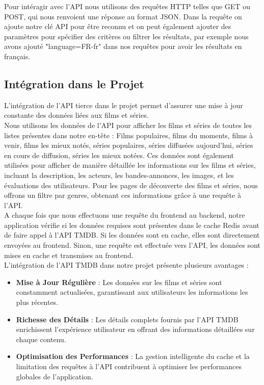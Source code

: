 \documentclass[a4paper]{article}
\begin{document}
Pour intéragir avec l'API nous utilisons des requêtes HTTP telles que GET ou POST, qui nous renvoient une réponse au format JSON. Dans la requête on ajoute notre clé API pour être reconnu et on peut également ajouter des paramètres pour spécifier des critères ou filtrer les résultats, par exemple nous avons ajouté "language=FR-fr" dans nos requêtes pour avoir les résultats en français. 

\subsection{Intégration dans le Projet}

L'intégration de l'API tierce dans le projet permet d'assurer une mise à jour constante des données liées aux films et séries. \\
Nous utilisons les données de l'API pour afficher les films et séries de toutes les listes présentes dans notre en-tête : Films populaires, films du moments, films à venir, films les mieux notés, séries populaires, séries diffusées aujourd'hui, séries en cours de diffusion, séries les mieux notées. Ces données sont également utilisées pour afficher de manière détaillée les informations sur les films et séries, incluant la description, les acteurs, les bandes-annonces, les images, et les évaluations des utilisateurs. Pour les pages de découverte des films et séries, nous offrons un filtre par genres, obtenant ces informations grâce à une requête à l'API. \\

\noindent A chaque fois que nous effectuons une requête du frontend au backend, notre application vérifie si les données requises sont présentes dans le cache Redis avant de faire appel à l'API TMDB. Si les données sont en cache, elles sont directement envoyées au frontend. Sinon, une requête est effectuée vers l'API, les données sont mises en cache et transmises au frontend. \\

\noindent L'intégration de l'API TMDB dans notre projet présente plusieurs avantages : \\
\begin{itemize}
    \item \textbf{Mise à Jour Régulière} : Les données sur les films et séries sont constamment actualisées, garantissant aux utilisateurs les informations les plus récentes. \\
    
    \item \textbf{Richesse des Détails} : Les détails complets fournis par l'API TMDB enrichissent l'expérience utilisateur en offrant des informations détaillées sur chaque contenu.\\
    
    \item \textbf{Optimisation des Performances} : La gestion intelligente du cache et la limitation des requêtes à l'API contribuent à optimiser les performances globales de l'application.\newline
\end{itemize}
\end{document}
